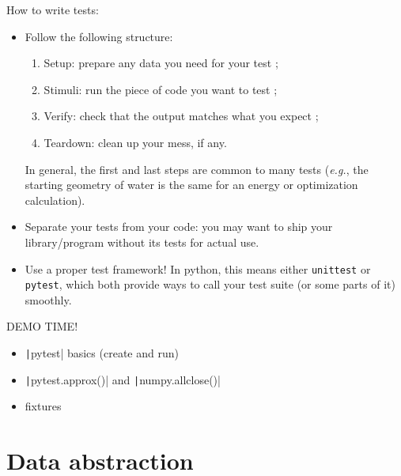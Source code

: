 \documentclass[10pt,
aspectratio=169
]{beamer}
\begin{document}
\begin{frame}
	How to write tests:\begin{itemize}
		\item Follow the following structure:\begin{enumerate}
			\item Setup: prepare any data you need for your test ;
			\item Stimuli: run the piece of code you want to test ;
			\item Verify: check that the output matches what you expect ;
			\item Teardown: clean up your mess, if any.
		\end{enumerate}
		In general, the first and last steps are common to many tests (\textit{e.g.}, the starting geometry of water is the same for an energy or optimization calculation).
		\item Separate your tests from your code: you may want to ship your library/program without its tests for actual use.
		\item Use a proper test framework! In python, this means either \texttt{unittest} or \texttt{pytest}, which both provide ways to call your test suite (or some parts of it) smoothly.
	\end{itemize}
\end{frame}

\begin{frame}
\begin{center}
	{\LARGE DEMO TIME!}
	
	\begin{itemize}
		\item \texttt|pytest| basics (create and run)
		\item  \texttt|pytest.approx()| and \texttt|numpy.allclose()|
		\item fixtures
	\end{itemize}
\end{center}
\end{frame}

\section{Data abstraction}


\newcommand{\Ox}[1]{\ensuremath{\mathcal{O}(#1)}}
\end{document}
